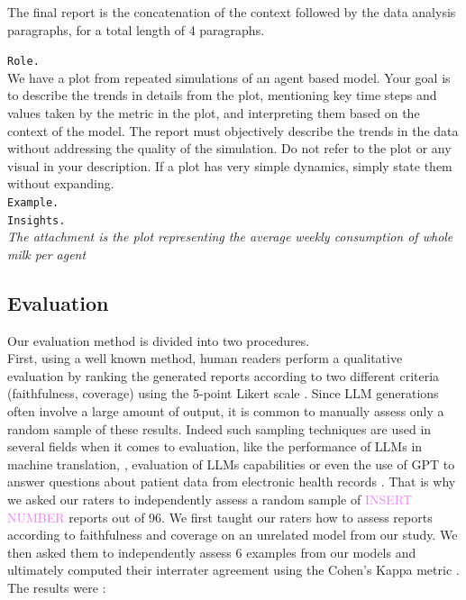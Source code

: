 \documentclass[preprint,12pt]{elsarticle}
\begin{document}
The final report is the concatenation of the context followed by the data analysis paragraphs, for a total length of 4 paragraphs.\\

\vspace*{-2cm}
\begin{tcolorbox}[colback=white!95!gray, colframe=black, title=Prompt 2 : \texttt{text} is a feature from the design of experiment. \textit{text} is a part of the prompt changing according to the model and the experiment. Complete prompts can be found in the supplementary material file.,  label=box:prompt2]
\texttt{Role.}\\

We have a plot from repeated simulations of an agent based model. Your goal is to describe the trends in details from the plot, mentioning key time steps and values taken by the metric in the plot, and interpreting them based on the context of the model. The report must objectively describe the trends in the data without addressing the quality of the simulation. Do not refer to the plot or any visual in your description. If a plot has very simple dynamics, simply state them without expanding.\\

\texttt{Example.}\\

\texttt{Insights.}\\

\textit{The attachment is the plot representing the average weekly consumption of whole milk per agent}
\end{tcolorbox}




\subsection{Evaluation}
\label{subsec4}


Our evaluation method is divided into two procedures. \\

First, using a well known method, human readers perform a qualitative evaluation by ranking the generated reports according to two different criteria (faithfulness, coverage) using the 5-point Likert scale \cite{Fischer2022} \cite{Li2022} \cite{Gatt2018}. Since LLM generations often involve a large amount of output, it is common to manually assess only a random sample of these results. Indeed such sampling techniques are used in several fields when it comes to evaluation, like the performance of LLMs in machine translation, \cite{Hendy2023}, evaluation of LLMs capabilities \cite{openai2024} or even the use of GPT to answer questions about patient data from electronic health records \cite{Vatsal2024}. That is why we asked our raters to independently assess a random sample of \textcolor{violet}{INSERT NUMBER} reports out of $96$. We first taught our raters how to assess reports according to faithfulness and coverage on an unrelated model from our study. We then asked them to independently assess 6 examples from our models and ultimately computed their interrater agreement using the Cohen's Kappa metric \cite{Brake2024}. The results were : \\
\end{document}
